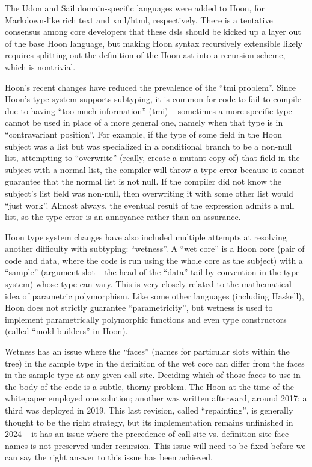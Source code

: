 \documentclass[twoside]{article}
\begin{document}
The Udon and Sail domain-specific languages were added to Hoon, for Markdown-like rich text and {\sc xml}/{\sc html}, respectively.  There is a tentative consensus among core developers that these {\sc dsl}s should be kicked up a layer out of the base Hoon language, but making Hoon syntax recursively extensible likely requires splitting out the definition of the Hoon {\sc ast} into a recursion scheme, which is nontrivial.

Hoon's recent changes have reduced the prevalence of the ``{\sc tmi} problem''.  Since Hoon's type system supports subtyping, it is common for code to fail to compile due to having ``too much information'' ({\sc tmi}) – sometimes a more specific type cannot be used in place of a more general one, namely when that type is in ``contravariant position''.  For example, if the type of some field in the Hoon subject was a list but was specialized in a conditional branch to be a non-null list, attempting to ``overwrite'' (really, create a mutant copy of) that field in the subject with a normal list, the compiler will throw a type error because it cannot guarantee that the normal list is not null.  If the compiler did not know the subject's list field was non-null, then overwriting it with some other list would ``just work''.  Almost always, the eventual result of the expression admits a null list, so the type error is an annoyance rather than an assurance.

Hoon type system changes have also included multiple attempts at resolving another difficulty with subtyping: ``wetness''.  A ``wet core'' is a Hoon core (pair of code and data, where the code is run using the whole core as the subject) with a ``sample'' (argument slot – the head of the ``data'' tail by convention in the type system) whose type can vary.  This is very closely related to the mathematical idea of parametric polymorphism.  Like some other languages (including Haskell), Hoon does not strictly guarantee ``parametricity'', but wetness is used to implement parametrically polymorphic functions and even type constructors (called ``mold builders'' in Hoon).

Wetness has an issue where the ``faces'' (names for particular slots within the tree) in the sample type in the definition of the wet core can differ from the faces in the sample type at any given call site.  Deciding which of those faces to use in the body of the code is a subtle, thorny problem.  The Hoon at the time of the whitepaper employed one solution; another was written afterward, around 2017; a third was deployed in 2019.  This last revision, called ``repainting'', is generally thought to be the right strategy, but its implementation remains unfinished in 2024 – it has an issue where the precedence of call-site vs. definition-site face names is not preserved under recursion.  This issue will need to be fixed before we can say the right answer to this issue has been achieved.
\end{document}
